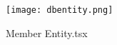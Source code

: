 \begin{figure}[h]
    \centering
    \texttt{[image: dbentity.png]}
    \caption{Member Entity.tsx}
    \label{fig: dbentity}
\end{figure}



